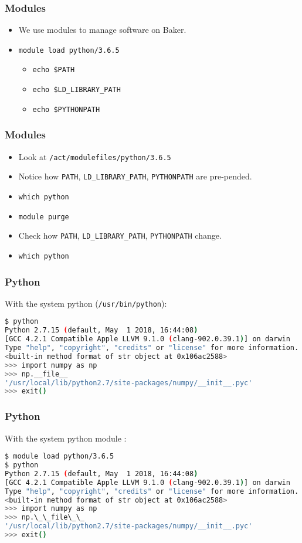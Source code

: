\documentclass{beamer}
\newcommand{\code}[1]{\colorbox{codegray}{\texttt{#1}}}
\begin{document}
\begin{frame}
\frametitle{Modules}
\begin{itemize}
    \item We use modules to manage software on Baker.
    \pause
    \item \code{module load python/3.6.5}
    \pause
    \begin{itemize}
        \item \code{echo \$PATH}
        \pause
        \item \code{echo \$LD\_LIBRARY\_PATH}
        \pause
        \item \code{echo \$PYTHONPATH}
    \end{itemize}
\end{itemize}
\end{frame}


\begin{frame}
\frametitle{Modules}
\begin{itemize}
    \item Look at \code{/act/modulefiles/python/3.6.5}
    \pause
    \item Notice how \code{PATH}, \code{LD\_LIBRARY\_PATH}, \code{PYTHONPATH} are pre-pended.
    \pause
    \item \code{which python}
    \pause
    \item \code{module purge}
    \pause
    \item Check how \code{PATH}, \code{LD\_LIBRARY\_PATH}, \code{PYTHONPATH} change.
    \pause
    \item \code{which python}
\end{itemize}
\end{frame}


\begin{frame}[fragile]
\frametitle{Python}
With the system python (\code{/usr/bin/python}):
\begingroup
\tiny
\begin{lstlisting}[backgroundcolor = \color{codegray}, language = Bash, showstringspaces=false]
$ python
Python 2.7.15 (default, May  1 2018, 16:44:08)
[GCC 4.2.1 Compatible Apple LLVM 9.1.0 (clang-902.0.39.1)] on darwin
Type "help", "copyright", "credits" or "license" for more information.
<built-in method format of str object at 0x106ac2588>
>>> import numpy as np
>>> np.__file__
'/usr/local/lib/python2.7/site-packages/numpy/__init__.pyc'
>>> exit()
\end{lstlisting}
\endgroup
\end{frame}


\begin{frame}[fragile]
\frametitle{Python}
With the system python module :
\begingroup
\tiny
\begin{lstlisting}[backgroundcolor = \color{codegray}, language = Bash, showstringspaces=false]
$ module load python/3.6.5
$ python
Python 2.7.15 (default, May  1 2018, 16:44:08)
[GCC 4.2.1 Compatible Apple LLVM 9.1.0 (clang-902.0.39.1)] on darwin
Type "help", "copyright", "credits" or "license" for more information.
<built-in method format of str object at 0x106ac2588>
>>> import numpy as np
>>> np.\_\_file\_\_
'/usr/local/lib/python2.7/site-packages/numpy/__init__.pyc'
>>> exit()
\end{lstlisting}
\endgroup
\end{frame}
\end{document}
